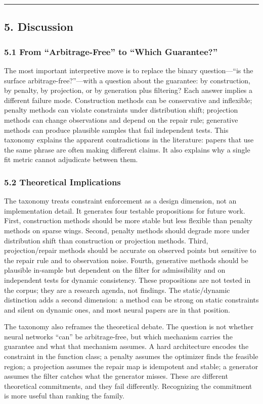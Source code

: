 \documentclass[11pt]{article}
\begin{document}
\par\medskip\hrule\medskip
\subsection*{5. Discussion}
\subsubsection*{5.1 From “Arbitrage-Free” to “Which Guarantee?”}
The most important interpretive move is to replace the binary question—“is the surface arbitrage-free?”—with a question about the guarantee: by construction, by penalty, by projection, or by generation plus filtering? Each answer implies a different failure mode. Construction methods can be conservative and inflexible; penalty methods can violate constraints under distribution shift; projection methods can change observations and depend on the repair rule; generative methods can produce plausible samples that fail independent tests. This taxonomy explains the apparent contradictions in the literature: papers that use the same phrase are often making different claims. It also explains why a single fit metric cannot adjudicate between them.

\subsubsection*{5.2 Theoretical Implications}
The taxonomy treats constraint enforcement as a design dimension, not an implementation detail. It generates four testable propositions for future work. First, construction methods should be more stable but less flexible than penalty methods on sparse wings. Second, penalty methods should degrade more under distribution shift than construction or projection methods. Third, projection/repair methods should be accurate on observed points but sensitive to the repair rule and to observation noise. Fourth, generative methods should be plausible in-sample but dependent on the filter for admissibility and on independent tests for dynamic consistency. These propositions are not tested in the corpus; they are a research agenda, not findings. The static/dynamic distinction adds a second dimension: a method can be strong on static constraints and silent on dynamic ones, and most neural papers are in that position.

The taxonomy also reframes the theoretical debate. The question is not whether neural networks “can” be arbitrage-free, but which mechanism carries the guarantee and what that mechanism assumes. A hard architecture encodes the constraint in the function class; a penalty assumes the optimizer finds the feasible region; a projection assumes the repair map is idempotent and stable; a generator assumes the filter catches what the generator misses. These are different theoretical commitments, and they fail differently. Recognizing the commitment is more useful than ranking the family.
\end{document}
